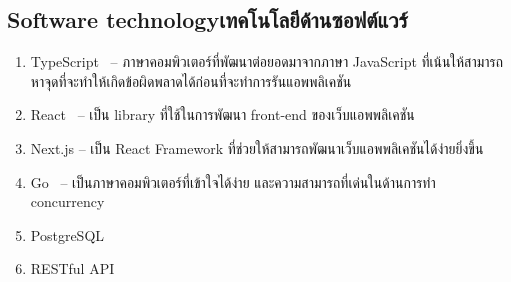 \subsection{\ifenglish Software technology\else เทคโนโลยีด้านซอฟต์แวร์\fi}
\begin{enumerate}
    \item TypeScript~\cite{typescript} -- ภาษาคอมพิวเตอร์ที่พัฒนาต่อยอดมาจากภาษา JavaScript
          ที่เน้นให้สามารถหาจุดที่จะทำให้เกิดข้อผิดพลาดได้ก่อนที่จะทำการรันแอพพลิเคชัน
    \item React~\cite{react} -- เป็น library ที่ใช้ในการพัฒนา front-end ของเว็บแอพพลิเคชัน
    \item Next.js\cite{nextjs} -- เป็น React Framework ที่ช่วยให้สามารถพัฒนาเว็บแอพพลิเคชันได้ง่ายยิ่งขึ้น
    \item Go~\cite{golang} -- เป็นภาษาคอมพิวเตอร์ที่เข้าใจได้ง่าย และความสามารถที่เด่นในด้านการทำ concurrency
    \item PostgreSQL
    \item RESTful API
\end{enumerate}


